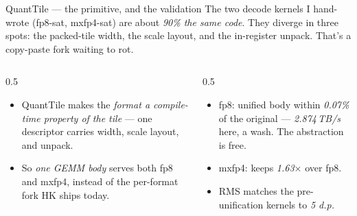 \documentclass[pdf,aspectratio=169]{beamer}
\newcommand{\empy}[1]{{\color{darkorange}\emph{#1}}}
\newcommand{\empr}[1]{{\color{cardinalred}\emph{#1}}}
\newcommand{\examplebox}[2]{%
\begin{tcolorbox}[colframe=darkcardinal,colback=boxgray,title={#1}]
#2
\end{tcolorbox}}
\newcommand{\mc}[1]{{\ttfamily\small #1}}
\begin{document}
\begin{frame}{QuantTile --- the primitive, and the validation}
\small
The two decode kernels I hand-wrote (\mc{fp8-sat}, \mc{mxfp4-sat}) are about \empy{90\% the same code}. They diverge in three spots: the packed-tile width, the scale layout, and the in-register unpack. That's a copy-paste fork waiting to rot.
\vspace{0.5ex}
\begin{columns}
\begin{column}{0.5\textwidth}
\begin{itemize}
  \item QuantTile makes the \empr{format a compile-time property of the tile} --- one descriptor carries width, scale layout, and unpack.
  \item So \empy{one GEMM body} serves both fp8 and mxfp4, instead of the per-format fork HK ships today.
\end{itemize}
\end{column}
\begin{column}{0.5\textwidth}
\examplebox{Validated on the MI350X node, identical inputs}{\small
\begin{itemize}
  \item fp8: unified body within \empr{0.07\%} of the original --- \empr{2.874\,TB/s} here, a wash. The abstraction is free.
  \item mxfp4: keeps \empr{1.63$\times$} over fp8.
  \item RMS matches the pre-unification kernels to \empy{5 d.p.}
\end{itemize}}
\end{column}
\end{columns}
\end{frame}
\end{document}
